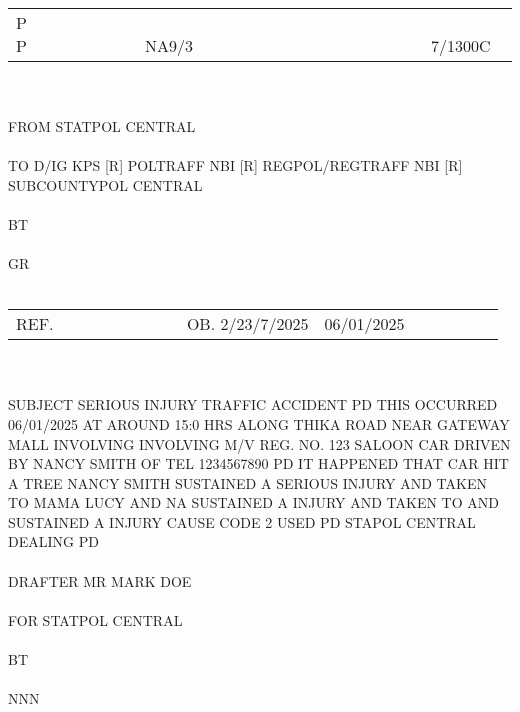 \documentclass{article}\usepackage[]{graphicx}\usepackage[]{xcolor}
\begin{document}
\noindent \\
\begin{tabular}{@{}lcr} %
P    P & ~~~~~~~~~~~~~~~~~~~~~~~ NA9/3 & ~~~~~~~~~~~~~~~~~~ 7/1300C ~ \\
\end{tabular}
\\
\\
FROM STATPOL CENTRAL  \\
\\
TO D/IG KPS [R] POLTRAFF NBI [R] REGPOL/REGTRAFF NBI [R] SUBCOUNTYPOL CENTRAL \\
\\
BT \\
\\
GR  \\
\\
\begin{tabularx}{\textwidth}{@{}lXr} %
REF. & ~~~~~~~~~~~~~~ OB. 2/23/7/2025 & 06/01/2025 ~~~~~~~~~~ \\
\end{tabularx}
\\
\\
SUBJECT  SERIOUS INJURY TRAFFIC ACCIDENT PD THIS OCCURRED 06/01/2025 AT AROUND 15:0  HRS ALONG THIKA ROAD NEAR GATEWAY MALL INVOLVING INVOLVING M/V REG. NO. 123 SALOON CAR DRIVEN BY NANCY SMITH OF TEL 1234567890 PD IT HAPPENED THAT CAR HIT A TREE NANCY SMITH SUSTAINED A SERIOUS INJURY AND TAKEN TO MAMA LUCY AND NA SUSTAINED A INJURY AND TAKEN TO AND  SUSTAINED A  INJURY  CAUSE CODE 2 USED PD STAPOL CENTRAL DEALING PD \\
\\
DRAFTER MR MARK DOE \\
\\
FOR STATPOL CENTRAL \\
\\
BT  \\
\\
NNN  \\

\newpage
\end{document}

